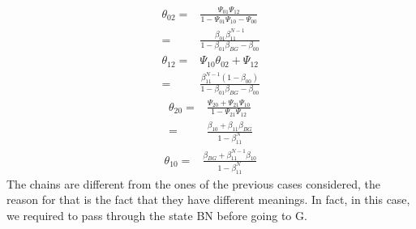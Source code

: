\begin{equation*}
	\begin{split}
		\theta_{02} = & \frac{\Psi_{01}\Psi_{12}}{1 - \Psi_{01}\Psi_{10} - \Psi_{00}}\\
		= & \frac{\beta_{01}\beta_{11}^{N-1}}{1- \beta_{01}\beta_{BG}-\beta_{00}}
	\end{split}
\end{equation*}
\begin{equation*}
	\begin{split}
		\theta_{12} = & \Psi_{10}\theta_{02}+\Psi_{12}\\
		= & \frac{\beta_{11}^{N-1}(1-\beta_{00})}{1- \beta_{01}\beta_{BG}-\beta_{00}}
	\end{split}
\end{equation*}
\begin{equation*}
	\begin{split}
		\theta_{20} = & \frac{\Psi_{20}+\Psi_{21}\Psi_{10}}{1 - \Psi_{21}\Psi_{12}}\\
		= & \frac{\beta_{10}+ \beta_{11}\beta_{BG}}{1- \beta_{11}^N}
	\end{split}
\end{equation*}
\begin{equation*}
	\begin{split}
		\theta_{10} = & \frac{\beta_{BG} + \beta_{11}^{N-1}\beta_{10}}{1- \beta_{11}^N}
	\end{split}
\end{equation*}
The chains are different from the ones of the previous cases considered, the reason for that is the fact that they have different meanings. In fact, in this case, we required to pass through the state BN before going to G.
